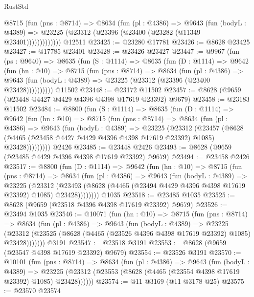 \begin{lexlean}{RustStd}
\begin{coremodule}
            @8715
              (fun (pns : @8714) =>
              @8634
                (fun (pl : @4386) =>
                @9643
                  (fun (bodyL : @4389) =>
                  @23225 (@23312 (@23396 (@23400 (@23282 (@11349 @23401)))))))))))))
    @12511
@23425 := @23280 @17781
@23426 := @8628 @23425
@23427 := @17785 @23401
@23428 := @23426 @23427
@23447 := @9967
    (fun (ps : @9640) =>
    @8635
      (fun (S : @1114) =>
      @8635
        (fun (D : @1114) =>
        @9642
          (fun (hn : @10) =>
          @8715
            (fun (pns : @8714) =>
            @8634
              (fun (pl : @4386) =>
              @9643 (fun (bodyL : @4389) => @23225 (@23312 (@23396 (@23400 @23428))))))))))
    @11502
@23448 := @23172 @11502
@23457 := @8628 (@9659 (@23448 @4427 @4429 @4396 @4398 @17619 @23392) @9679)
@23458 := @23183 @11502
@23484 := @8800
    (fun (S : @1114) =>
    @8635
      (fun (D : @1114) =>
      @9642
        (fun (hn : @10) =>
        @8715
          (fun (pns : @8714) =>
          @8634
            (fun (pl : @4386) =>
            @9643
              (fun (bodyL : @4389) =>
              @23225
                (@23312
                  (@23457
                    (@8628
                      (@4465 (@23458 @4427 @4429 @4396 @4398 @17619 @23392) @1085)
                      @23428)))))))))
    @2426
@23485 := @23448 @2426
@23493 := @8628 (@9659 (@23485 @4429 @4396 @4398 @17619 @23392) @9679)
@23494 := @23458 @2426
@23517 := @8800
    (fun (D : @1114) =>
    @9642
      (fun (hn : @10) =>
      @8715
        (fun (pns : @8714) =>
        @8634
          (fun (pl : @4386) =>
          @9643
            (fun (bodyL : @4389) =>
            @23225
              (@23312
                (@23493 (@8628 (@4465 (@23494 @4429 @4396 @4398 @17619 @23392) @1085) @23428))))))))
    @1035
@23518 := @23485 @1035
@23525 := @8628 (@9659 (@23518 @4396 @4398 @17619 @23392) @9679)
@23526 := @23494 @1035
@23546 := @10071
    (fun (hn : @10) =>
    @8715
      (fun (pns : @8714) =>
      @8634
        (fun (pl : @4386) =>
        @9643
          (fun (bodyL : @4389) =>
          @23225
            (@23312 (@23525 (@8628 (@4465 (@23526 @4396 @4398 @17619 @23392) @1085) @23428)))))))
    @3191
@23547 := @23518 @3191
@23553 := @8628 (@9659 (@23547 @4398 @17619 @23392) @9679)
@23554 := @23526 @3191
@23570 := @10101
    (fun (pns : @8714) =>
    @8634
      (fun (pl : @4386) =>
      @9643
        (fun (bodyL : @4389) =>
        @23225 (@23312 (@23553 (@8628 (@4465 (@23554 @4398 @17619 @23392) @1085) @23428))))))
@23574 := @11 @3169 (@11 @3178 @25)
@23575 := @23570 @23574

\end{coremodule}
\end{lexlean}
